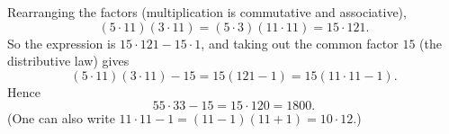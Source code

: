 Rearranging the factors (multiplication is commutative and associative),
\[(5\cdot11)(3\cdot11)=(5\cdot3)(11\cdot11)=15\cdot121.\]
So the expression is $15\cdot121-15\cdot1$, and taking out the common factor $15$ (the distributive law) gives
\[(5\cdot11)(3\cdot11)-15=15(121-1)=15\left(11\cdot11-1\right).\]
Hence
\[55\cdot33-15=15\cdot120=\boxed{1800}.\]
(One can also write $11\cdot11-1=(11-1)(11+1)=10\cdot12$.)
